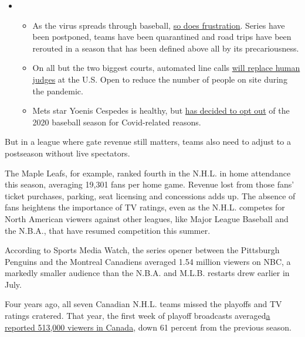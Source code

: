 \begin{itemize}
\item
  \begin{itemize}
  \tightlist
  \item
    As the virus spreads through baseball,
    \href{https://www.nytimes.com/2020/08/03/sports/baseball/mlb-coronavirus-outbreak.html?action=click\&pgtype=Article\&state=default\&region=MAIN_CONTENT_2\&context=storylines_keepup}{so
    does frustration}. Series have been postponed, teams have been
    quarantined and road trips have been rerouted in a season that has
    been defined above all by its precariousness.
  \item
    On all but the two biggest courts, automated line calls
    \href{https://www.nytimes.com/2020/08/03/sports/tennis/us-open-hawkeye-line-judges.html?action=click\&pgtype=Article\&state=default\&region=MAIN_CONTENT_2\&context=storylines_keepup}{will
    replace human judges} at the U.S. Open to reduce the number of
    people on site during the pandemic.
  \item
    Mets star Yoenis Cespedes is healthy, but
    \href{https://www.nytimes.com/2020/08/02/sports/baseball/Yoenis-cespedes-opt-out-rule.html?action=click\&pgtype=Article\&state=default\&region=MAIN_CONTENT_2\&context=storylines_keepup}{has
    decided to opt out} of the 2020 baseball season for Covid-related
    reasons.
  \end{itemize}
\end{itemize}

But in a league where gate revenue still matters, teams also need to
adjust to a postseason without live spectators.

The Maple Leafs, for example, ranked fourth in the N.H.L. in home
attendance this season, averaging 19,301 fans per home game. Revenue
lost from those fans' ticket purchases, parking, seat licensing and
concessions adds up. The absence of fans heightens the importance of TV
ratings, even as the N.H.L. competes for North American viewers against
other leagues, like Major League Baseball and the N.B.A., that have
resumed competition this summer.

According to Sports Media Watch, the series opener between the
Pittsburgh Penguins and the Montreal Canadiens averaged 1.54 million
viewers on NBC, a markedly smaller audience than the N.B.A. and M.L.B.
restarts drew earlier in July.

Four years ago, all seven Canadian N.H.L. teams missed the playoffs and
TV ratings cratered. That year, the first week of playoff broadcasts
averaged\href{https://thehockeynews.com/news/article/playoff-tv-ratings-down-a-shocking-61-percent-in-canada}{a
reported 513,000 viewers in Canada}, down 61 percent from the previous
season.

